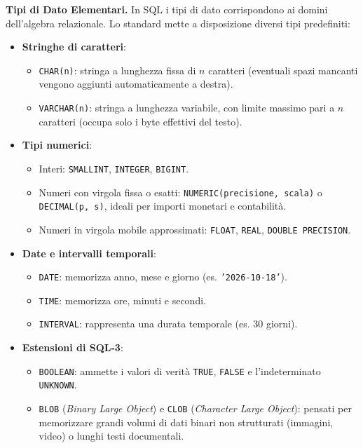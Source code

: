 \documentclass[12pt]{extarticle}
\begin{document}
\noindent \textbf{Tipi di Dato Elementari.} In SQL i tipi di dato corrispondono ai domini dell'algebra relazionale. Lo standard mette a disposizione diversi tipi predefiniti:
\begin{itemize}
    \item \textbf{Stringhe di caratteri}:
    \begin{itemize}
        \item \texttt{CHAR(n)}: stringa a lunghezza fissa di $n$ caratteri (eventuali spazi mancanti vengono aggiunti automaticamente a destra).
        \item \texttt{VARCHAR(n)}: stringa a lunghezza variabile, con limite massimo pari a $n$ caratteri (occupa solo i byte effettivi del testo).
    \end{itemize}
    \item \textbf{Tipi numerici}:
    \begin{itemize}
        \item Interi: \texttt{SMALLINT}, \texttt{INTEGER}, \texttt{BIGINT}.
        \item Numeri con virgola fissa o esatti: \texttt{NUMERIC(precisione, scala)} o \texttt{DECIMAL(p, s)}, ideali per importi monetari e contabilità.
        \item Numeri in virgola mobile approssimati: \texttt{FLOAT}, \texttt{REAL}, \texttt{DOUBLE PRECISION}.
    \end{itemize}
    \item \textbf{Date e intervalli temporali}:
    \begin{itemize}
        \item \texttt{DATE}: memorizza anno, mese e giorno (es. \texttt{'2026-10-18'}).
        \item \texttt{TIME}: memorizza ore, minuti e secondi.
        \item \texttt{INTERVAL}: rappresenta una durata temporale (es. 30 giorni).
    \end{itemize}
    \item \textbf{Estensioni di SQL-3}:
    \begin{itemize}
        \item \texttt{BOOLEAN}: ammette i valori di verità \texttt{TRUE}, \texttt{FALSE} e l'indeterminato \texttt{UNKNOWN}.
        \item \texttt{BLOB} (\textit{Binary Large Object}) e \texttt{CLOB} (\textit{Character Large Object}): pensati per memorizzare grandi volumi di dati binari non strutturati (immagini, video) o lunghi testi documentali.
    \end{itemize}
\end{itemize}
\end{document}

